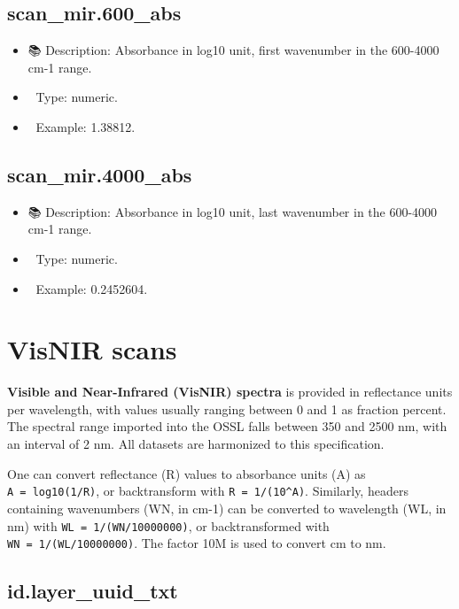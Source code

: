 \documentclass[
  letterpaper,
  DIV=11,
  numbers=noendperiod]{scrreprt}
\providecommand{\tightlist}{%
  \setlength{\itemsep}{0pt}\setlength{\parskip}{0pt}}\usepackage{longtable,booktabs,array}
\begin{document}
\subsection{scan\_mir.600\_abs}\label{scan_mir.600_abs}

\begin{itemize}
\tightlist
\item
  📚 Description: Absorbance in log10 unit, first wavenumber in the
  600-4000 cm-1 range.
\item
  🔢 Type: numeric.
\item
  📖 Example: 1.38812.
\end{itemize}

\subsection{scan\_mir.4000\_abs}\label{scan_mir.4000_abs}

\begin{itemize}
\tightlist
\item
  📚 Description: Absorbance in log10 unit, last wavenumber in the
  600-4000 cm-1 range.
\item
  🔢 Type: numeric.
\item
  📖 Example: 0.2452604.
\end{itemize}

\section{VisNIR scans}\label{visnir-table}

\textbf{Visible and Near-Infrared (VisNIR) spectra} is provided in
reflectance units per wavelength, with values usually ranging between 0
and 1 as fraction percent. The spectral range imported into the OSSL
falls between 350 and 2500 nm, with an interval of 2 nm. All datasets
are harmonized to this specification.

One can convert reflectance (R) values to absorbance units (A) as
\texttt{A\ =\ log10(1/R)}, or backtransform with
\texttt{R\ =\ 1/(10\^{}A)}. Similarly, headers containing wavenumbers
(WN, in cm-1) can be converted to wavelength (WL, in nm) with
\texttt{WL\ =\ 1/(WN/10000000)}, or backtransformed with
\texttt{WN\ =\ 1/(WL/10000000)}. The factor 10M is used to convert cm to
nm.

\subsection{id.layer\_uuid\_txt}\label{id.layer_uuid_txt-3}
\end{document}
